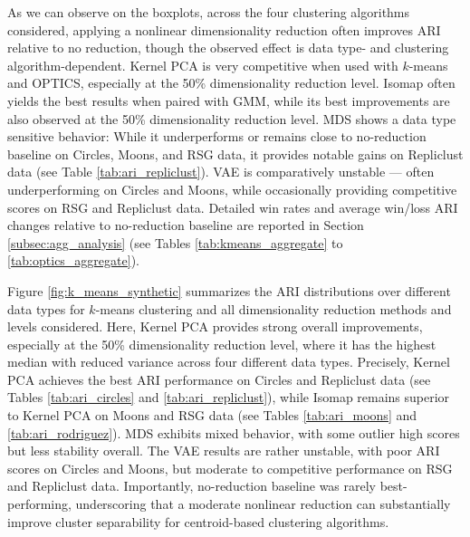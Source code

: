 \documentclass[preprint,12pt]{elsarticle}
\begin{document}
As we can observe on the boxplots, across the four clustering algorithms considered, applying a nonlinear dimensionality reduction often improves ARI relative to no reduction, though the observed effect is data type- and clustering algorithm-dependent. 
Kernel PCA is very competitive when used with $k$-means and OPTICS, especially at the 50\% dimensionality reduction level.
Isomap often yields the best results when paired with GMM, while its best improvements are also observed at the 50\% dimensionality reduction level. MDS shows a data type sensitive behavior: While it underperforms or remains close to no-reduction baseline on Circles, Moons, and RSG data, it provides notable gains on Repliclust data (see Table \ref{tab:ari_repliclust}). VAE is comparatively unstable — often underperforming on Circles and Moons, while occasionally providing competitive scores on RSG and Repliclust data. Detailed win rates and average win/loss ARI changes relative to no-reduction baseline are reported in Section \ref{subsec:agg_analysis} (see Tables \ref{tab:kmeans_aggregate} to \ref{tab:optics_aggregate}).

Figure \ref{fig:k_means_synthetic} summarizes the ARI distributions over different data types for $k$-means clustering and all dimensionality reduction methods and levels considered. Here, Kernel PCA provides strong overall improvements, especially at the 50\% dimensionality reduction level, where it has the highest median with reduced variance across four different data types. Precisely, Kernel PCA achieves the best ARI performance on Circles and Repliclust data (see Tables \ref{tab:ari_circles} and \ref{tab:ari_repliclust}), while Isomap remains superior to Kernel PCA on Moons and RSG data (see Tables \ref{tab:ari_moons} and \ref{tab:ari_rodriguez}). MDS exhibits mixed behavior, with some outlier high scores but less stability overall. The VAE results are rather unstable, with poor ARI scores on Circles and Moons, but moderate to competitive performance on RSG and Repliclust data. Importantly, no-reduction baseline was rarely best-performing, underscoring that a moderate nonlinear reduction can substantially improve cluster separability for centroid-based clustering algorithms.
\end{document}
